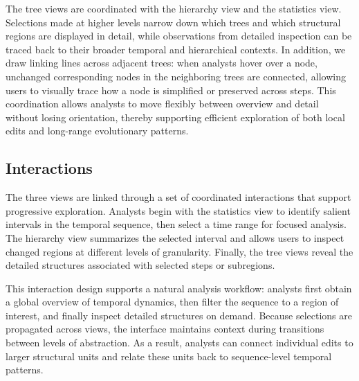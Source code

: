 The tree views are coordinated with the hierarchy view and the statistics view. Selections made at higher levels narrow down which trees and which structural regions are displayed in detail, while observations from detailed inspection can be traced back to their broader temporal and hierarchical contexts. In addition, we draw linking lines across adjacent trees: when analysts hover over a node, unchanged corresponding nodes in the neighboring trees are connected, allowing users to visually trace how a node is simplified or preserved across steps. This coordination allows analysts to move flexibly between overview and detail without losing orientation, thereby supporting efficient exploration of both local edits and long-range evolutionary patterns.

\subsection{Interactions}
\label{sec:vis_interactions}

The three views are linked through a set of coordinated interactions that support progressive exploration. Analysts begin with the statistics view to identify salient intervals in the temporal sequence, then select a time range for focused analysis. The hierarchy view summarizes the selected interval and allows users to inspect changed regions at different levels of granularity. Finally, the tree views reveal the detailed structures associated with selected steps or subregions.

This interaction design supports a natural analysis workflow: analysts first obtain a global overview of temporal dynamics, then filter the sequence to a region of interest, and finally inspect detailed structures on demand. Because selections are propagated across views, the interface maintains context during transitions between levels of abstraction. As a result, analysts can connect individual edits to larger structural units and relate these units back to sequence-level temporal patterns.
